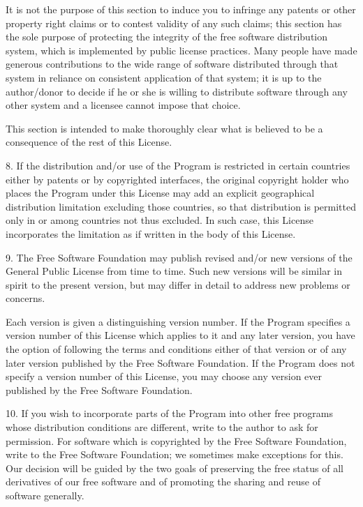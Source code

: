 \documentclass[letterpaper,10pt,english,openany,oneside]{sphinxmanual}
\begin{document}
\begin{sphinxVerbatim}[commandchars=\\\{\}]
It is not the purpose of this section to induce you to infringe any
patents or other property right claims or to contest validity of any
such claims; this section has the sole purpose of protecting the
integrity of the free software distribution system, which is
implemented by public license practices.  Many people have made
generous contributions to the wide range of software distributed
through that system in reliance on consistent application of that
system; it is up to the author/donor to decide if he or she is willing
to distribute software through any other system and a licensee cannot
impose that choice.

This section is intended to make thoroughly clear what is believed to
be a consequence of the rest of this License.

  8. If the distribution and/or use of the Program is restricted in
certain countries either by patents or by copyrighted interfaces, the
original copyright holder who places the Program under this License
may add an explicit geographical distribution limitation excluding
those countries, so that distribution is permitted only in or among
countries not thus excluded.  In such case, this License incorporates
the limitation as if written in the body of this License.

  9. The Free Software Foundation may publish revised and/or new versions
of the General Public License from time to time.  Such new versions will
be similar in spirit to the present version, but may differ in detail to
address new problems or concerns.

Each version is given a distinguishing version number.  If the Program
specifies a version number of this License which applies to it and \PYGZdq{}any
later version\PYGZdq{}, you have the option of following the terms and conditions
either of that version or of any later version published by the Free
Software Foundation.  If the Program does not specify a version number of
this License, you may choose any version ever published by the Free Software
Foundation.

  10. If you wish to incorporate parts of the Program into other free
programs whose distribution conditions are different, write to the author
to ask for permission.  For software which is copyrighted by the Free
Software Foundation, write to the Free Software Foundation; we sometimes
make exceptions for this.  Our decision will be guided by the two goals
of preserving the free status of all derivatives of our free software and
of promoting the sharing and reuse of software generally.


\end{sphinxVerbatim}
\end{document}
